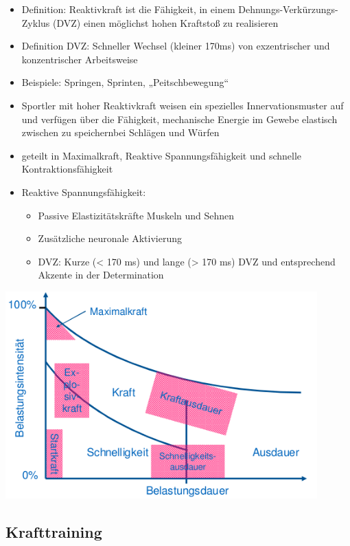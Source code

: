  \begin{itemize}
    \item Definition: Reaktivkraft ist die Fähigkeit, in einem Dehnungs-Verkürzungs-Zyklus (DVZ) einen möglichst hohen Kraftstoß zu realisieren
    \item Definition DVZ: Schneller Wechsel (kleiner 170ms) von exzentrischer und konzentrischer Arbeitsweise
    \item Beispiele: Springen, Sprinten, „Peitschbewegung“
    \item Sportler mit hoher Reaktivkraft weisen ein spezielles Innervationsmuster auf und verfügen über die Fähigkeit, mechanische Energie im Gewebe elastisch zwischen zu speichernbei Schlägen und Würfen
    \item geteilt in Maximalkraft, Reaktive Spannungsfähigkeit und schnelle Kontraktionsfähigkeit
    \item Reaktive Spannungsfähigkeit:
    \begin{itemize}
        \item Passive Elastizitätskräfte Muskeln und Sehnen
        \item Zusätzliche neuronale Aktivierung
        \item DVZ: Kurze (< 170 ms) und lange (> 170 ms) DVZ und entsprechend Akzente in der Determination
    \end{itemize}
\end{itemize}

\includegraphics[width=0.90\textwidth]{pictures/landkarte}

\subsection{Krafttraining}

